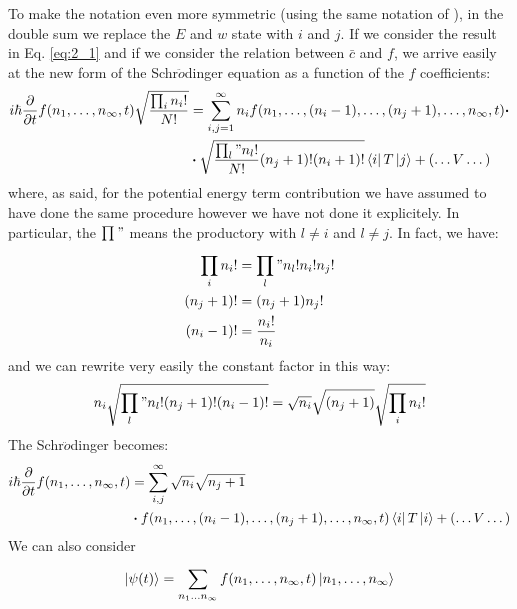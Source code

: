 \documentclass[../main/main.tex]{subfiles}
\begin{document}
To make the notation even more symmetric (using the same notation of \cite{fetter}), in the double sum we replace the \( E \) and \( w \) state with \( i \) and \( j \). If we consider the result in Eq. \eqref{eq:2_1} and if we consider the relation between \( \bar{c}  \) and \( f \), we arrive easily at the new form of the Schr$\ddot{o}$dinger equation as a function of the \( f \) coefficients:
\begin{equation}
\begin{split}
  i \hbar \pdv{}{t} f (n_1, \dots, n_ \infty, t)  \sqrt{\frac{\prod_{i}^{} n_i! }{N!}} &= \sum_{i,j=1}^{\infty }  n_i f (n_1, \dots, (n_i -1), \dots, (n_j+1), \dots, n_ \infty ,t) \vdot   \\
   & \vdot \sqrt{ \frac{ \prod_{l}^{}" n_l! }{N!} (n_j + 1 )! (n_i + 1)! }
  \bra{i} T \ket{j} + \qty(\dots V \dots)
\end{split}
\end{equation}
where, as said, for the potential energy term contribution we have assumed to have done the same procedure however we have not done it explicitely. In particular, the \( \prod_{}^{}" \)  means  the productory with \( l \neq i \)  and \( l \neq j \). In fact, we have:
\begin{subequations}
\begin{align*}
   \prod_{i}^{} n_i! &= \prod_{l}^{}" n_l! n_i! n_j! \\
    (n_j+1)!  & = (n_j+1) n_j! \\
    (n_i - 1)! & = \frac{n_i!}{n_i}
\end{align*}
\end{subequations}
and we can rewrite very easily the constant factor in this way:
\begin{equation*}
n_i \sqrt{\prod_{l}^{}" n_l ! (n_j+1)! (n_i-1)!  } = \sqrt{n_i} \sqrt{(n_j+1)} \sqrt{\prod_{i}^{} n_i!  }
\end{equation*}
The Schr$\ddot{o}$dinger becomes:
\begin{equation*}
\begin{split}
  i \hbar \pdv{}{t} f (n_1, \dots, n_ \infty , t) & = \sum_{i,j}^{\infty } \sqrt{n_i} \sqrt{n_j+1}   \\ & \vdot f (n_1, \dots, (n_i -1), \dots, (n_j+1), \dots, n_ \infty ,t) \bra{i} T \ket{i} + (\dots V \dots)
\end{split}
\end{equation*}
We can also consider
\begin{equation*}
  \ket{ \psi  (t)} = \sum_{n_1 \dots n_ \infty }^{} f(n_1, \dots, n_ \infty , t ) \ket{n_1, \dots, n_ \infty }
\end{equation*}
\end{document}
